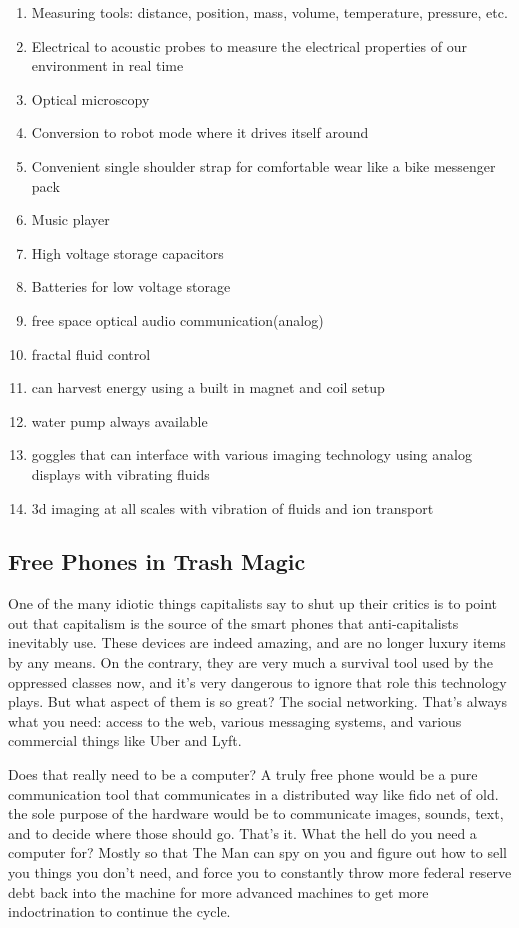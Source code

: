 \begin{enumerate}
\def\labelenumi{\arabic{enumi}.}
\tightlist
\item
  Measuring tools: distance, position, mass, volume, temperature,
  pressure, etc.
\item
  Electrical to acoustic probes to measure the electrical properties of
  our environment in real time
\item
  Optical microscopy
\item
  Conversion to robot mode where it drives itself around
\item
  Convenient single shoulder strap for comfortable wear like a bike
  messenger pack
\item
  Music player
\item
  High voltage storage capacitors
\item
  Batteries for low voltage storage
\item
  free space optical audio communication(analog)
\item
  fractal fluid control
\item
  can harvest energy using a built in magnet and coil setup
\item
  water pump always available
\item
  goggles that can interface with various imaging technology using
  analog displays with vibrating fluids
\item
  3d imaging at all scales with vibration of fluids and ion transport
\end{enumerate}

\subsection{Free Phones in Trash
Magic}\label{free-phones-in-trash-magic}

One of the many idiotic things capitalists say to shut up their critics
is to point out that capitalism is the source of the smart phones that
anti-capitalists inevitably use. These devices are indeed amazing, and
are no longer luxury items by any means. On the contrary, they are very
much a survival tool used by the oppressed classes now, and it's very
dangerous to ignore that role this technology plays. But what aspect of
them is so great? The social networking. That's always what you need:
access to the web, various messaging systems, and various commercial
things like Uber and Lyft.

Does that really need to be a computer? A truly free phone would be a
pure communication tool that communicates in a distributed way like fido
net of old. the sole purpose of the hardware would be to communicate
images, sounds, text, and to decide where those should go. That's it.
What the hell do you need a computer for? Mostly so that The Man can spy
on you and figure out how to sell you things you don't need, and force
you to constantly throw more federal reserve debt back into the machine
for more advanced machines to get more indoctrination to continue the
cycle.


